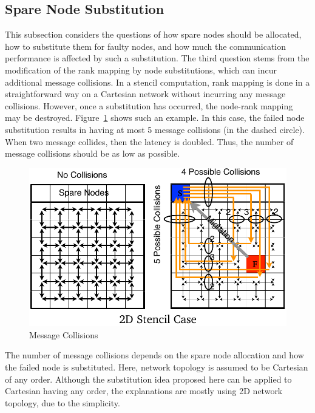 \subsection{Spare Node Substitution}

This subsection considers the questions of how spare nodes should be
allocated, how to substitute them for faulty nodes, and how much the
communication performance is affected by such a substitution.
The third question stems from the modification of the rank mapping by
node substitutions, which can incur additional message collisions.
In a stencil computation, rank mapping is done in a
straightforward way on a Cartesian network without incurring any
message collisions. However, once a substitution has occurred, the
node-rank mapping may be
destroyed. Figure~\ref{fig:message-collisions} shows such an
example. In this case, the failed node substitution results in having
at most 5 message collisions (in the dashed circle). When two message
collides, then the latency is doubled. Thus, the number of message
collisions should be as low as possible.

\begin{figure}[ht]
\begin{center}
\includegraphics[width=0.7\columnwidth]{Figs/Collisions.pdf}
  \caption{Message Collisions}
  \label{fig:message-collisions}
\end{center}
\end{figure}

The number of message collisions depends on the spare node allocation
and how the failed node is substituted. Here, network topology is
assumed to be Cartesian of any order. Although the substitution idea
proposed here can be applied to Cartesian having any order, the
explanations are mostly using 2D network topology, due to the
simplicity. 

